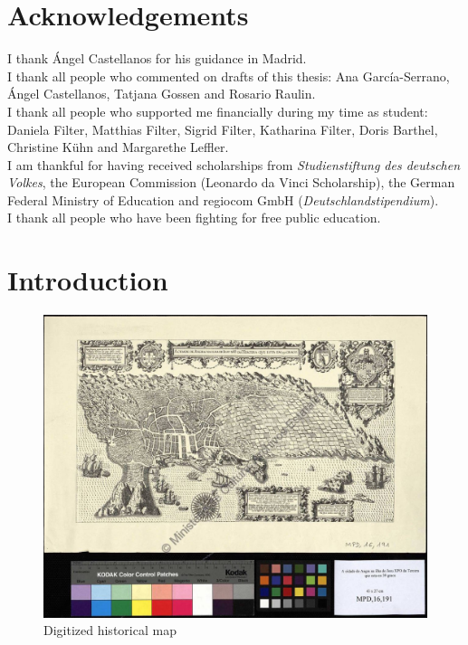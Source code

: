 \documentclass[11pt]{report}
\begin{document}
\newpage
\thispagestyle{empty}
\mbox{}

\chapter*{Acknowledgements}
I thank Ángel Castellanos for his guidance in Madrid.\\

I thank all people who commented on drafts of this thesis: Ana García-Serrano, Ángel Castellanos, Tatjana Gossen and Rosario Raulin. \\

I thank all people who supported me financially during my time as student: Daniela Filter, Matthias Filter, Sigrid Filter, Katharina Filter, Doris Barthel, Christine Kühn and Margarethe Leffler. \\

I am thankful for having received scholarships from \textit{Studienstiftung des deutschen Volkes}, the European Commission (Leonardo da Vinci Scholarship), the German Federal Ministry of Education and regiocom GmbH (\textit{Deutschlandstipendium}).\\

I thank all people who have been fighting for free public education.

\newpage
\thispagestyle{empty}
\mbox{}

\tableofcontents
\newpage

\listoffigures

\printglossary

\newpage
\thispagestyle{empty}
\mbox{}

\chapter{Introduction}
\label{Introduction}

\renewcommand{\thepage}{\arabic{page}}
\setcounter{page}{1}

\begin{figure}[!ht]
	\centering
	\includegraphics[width=\linewidth]{./images/map}
\caption{Digitized historical map}
\label{figure:map}
\end{figure}
\end{document}
